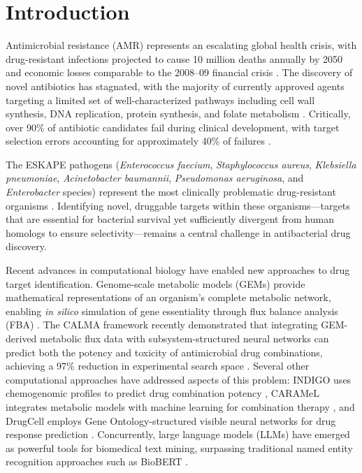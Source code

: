 \documentclass[12pt,a4paper]{article}
\begin{document}
\begin{abstract}
\medskip
\noindent\textbf{Keywords:} antimicrobial resistance, drug target discovery, genome-scale metabolic model, flux balance analysis, knowledge graph, LLM, drug combination, toxicity prediction, ESKAPE, open-source
\end{abstract}

\section{Introduction}

Antimicrobial resistance (AMR) represents an escalating global health crisis, with drug-resistant infections projected to cause 10 million deaths annually by 2050 and economic losses comparable to the 2008--09 financial crisis \citep{oneill2016}. The discovery of novel antibiotics has stagnated, with the majority of currently approved agents targeting a limited set of well-characterized pathways including cell wall synthesis, DNA replication, protein synthesis, and folate metabolism \citep{lewis2020}. Critically, over 90\% of antibiotic candidates fail during clinical development, with target selection errors accounting for approximately 40\% of failures \citep{payne2007}.

The ESKAPE pathogens (\textit{Enterococcus faecium}, \textit{Staphylococcus aureus}, \textit{Klebsiella pneumoniae}, \textit{Acinetobacter baumannii}, \textit{Pseudomonas aeruginosa}, and \textit{Enterobacter} species) represent the most clinically problematic drug-resistant organisms \citep{rice2008}. Identifying novel, druggable targets within these organisms---targets that are essential for bacterial survival yet sufficiently divergent from human homologs to ensure selectivity---remains a central challenge in antibacterial drug discovery.

Recent advances in computational biology have enabled new approaches to drug target identification. Genome-scale metabolic models (GEMs) provide mathematical representations of an organism's complete metabolic network, enabling \textit{in silico} simulation of gene essentiality through flux balance analysis (FBA) \citep{orth2010}. The CALMA framework recently demonstrated that integrating GEM-derived metabolic flux data with subsystem-structured neural networks can predict both the potency and toxicity of antimicrobial drug combinations, achieving a 97\% reduction in experimental search space \citep{arora2026}. Several other computational approaches have addressed aspects of this problem: INDIGO uses chemogenomic profiles to predict drug combination potency \citep{chandrasekaran2016}, CARAMeL integrates metabolic models with machine learning for combination therapy \citep{ji2023}, and DrugCell employs Gene Ontology-structured visible neural networks for drug response prediction \citep{kuenzi2020}. Concurrently, large language models (LLMs) have emerged as powerful tools for biomedical text mining, surpassing traditional named entity recognition approaches such as BioBERT \citep{lee2020, gu2022}.
\end{document}
